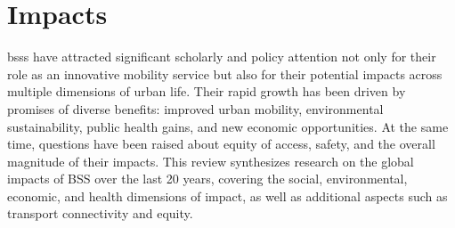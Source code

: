\section{Impacts}
\label{sec:impacts_of_bss}

\acp{bss} have attracted significant scholarly and policy attention not only for their role as an innovative mobility service but also for their potential impacts across multiple dimensions of urban life. Their rapid growth has been driven by promises of diverse benefits: improved urban mobility, environmental sustainability, public health gains, and new economic opportunities. At the same time, questions have been raised about equity of access, safety, and the overall magnitude of their impacts. This review synthesizes research on the global impacts of BSS over the last 20 years, covering the social, environmental, economic, and health dimensions of impact, as well as additional aspects such as transport connectivity and equity.







 

    